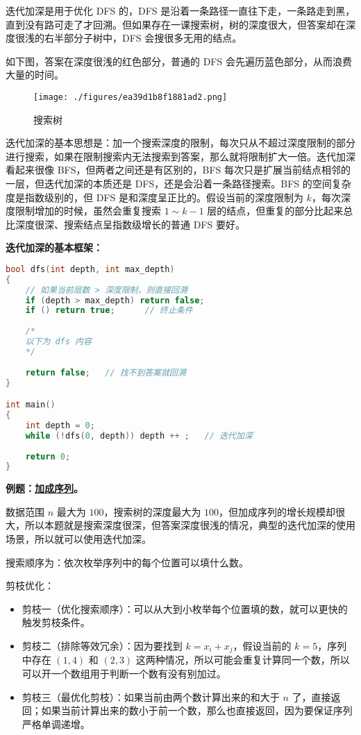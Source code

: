 

迭代加深是用于优化 DFS 的，DFS 是沿着一条路径一直往下走，一条路走到黑，直到没有路可走了才回溯。但如果存在一课搜索树，树的深度很大，但答案却在深度很浅的右半部分子树中，DFS 会搜很多无用的结点。

如下图，答案在深度很浅的红色部分，普通的 DFS 会先遍历蓝色部分，从而浪费大量的时间。

\begin{figure}[ht]
\centering
\texttt{[image: ./figures/ea39d1b8f1881ad2.png]}
\caption{搜索树} \label{fig_ID_1}
\end{figure}

迭代加深的基本思想是：加一个搜索深度的限制，每次只从不超过深度限制的部分进行搜索，如果在限制搜索内无法搜索到答案，那么就将限制扩大一倍。迭代加深看起来很像 BFS，但两者之间还是有区别的，BFS 每次只是扩展当前结点相邻的一层，但迭代加深的本质还是 DFS，还是会沿着一条路径搜索。BFS 的空间复杂度是指数级别的，但 DFS 是和深度呈正比的。假设当前的深度限制为 $k$，每次深度限制增加的时候，虽然会重复搜索 $1 \sim k - 1$ 层的结点，但重复的部分比起来总比深度很深、搜索结点呈指数级增长的普通 DFS 要好。

\textbf{迭代加深的基本框架：}
\begin{lstlisting}[language=cpp]
bool dfs(int depth, int max_depth)  
{
    // 如果当前层数 > 深度限制，则直接回溯
    if (depth > max_depth) return false; 
    if () return true;      // 终止条件
    
    /*
    以下为 dfs 内容
    */
    
    return false;   // 找不到答案就回溯
}

int main()
{
    int depth = 0;
    while (!dfs(0, depth)) depth ++ ;   // 迭代加深
    
    return 0;
}
\end{lstlisting}

\textbf{例题：\href{http://poj.org/problem?id=2248}{加成序列}。}

数据范围 $n$ 最大为 $100$，搜索树的深度最大为 $100$，但加成序列的增长规模却很大，所以本题就是搜索深度很深，但答案深度很浅的情况，典型的迭代加深的使用场景，所以就可以使用迭代加深。

搜索顺序为：依次枚举序列中的每个位置可以填什么数。

剪枝优化：
\begin{itemize}
\item 剪枝一（优化搜索顺序）：可以从大到小枚举每个位置填的数，就可以更快的触发剪枝条件。
\item 剪枝二（排除等效冗余）：因为要找到 $k = x_i + x_j$，假设当前的 $k = 5$，序列中存在 $(1, 4)$ 和 $(2, 3)$ 这两种情况，所以可能会重复计算同一个数，所以可以开一个数组用于判断一个数有没有别加过。
\item 剪枝三（最优化剪枝）：如果当前由两个数计算出来的和大于 $n$ 了，直接返回；如果当前计算出来的数小于前一个数，那么也直接返回，因为要保证序列严格单调递增。
\end{itemize}

